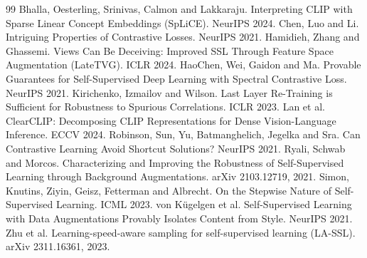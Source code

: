 \documentclass[11pt]{article}
\theoremstyle{definition}
\theoremstyle{remark}
\begin{document}
\begin{thebibliography}{99}\small
{} Bhalla, Oesterling, Srinivas, Calmon and Lakkaraju. Interpreting CLIP with Sparse Linear Concept
Embeddings (SpLiCE). NeurIPS 2024.
 Chen, Luo and Li. Intriguing Properties of Contrastive Losses. NeurIPS 2021.
 Hamidieh, Zhang and Ghassemi. Views Can Be Deceiving: Improved SSL Through Feature Space
Augmentation (LateTVG). ICLR 2024.
 HaoChen, Wei, Gaidon and Ma. Provable Guarantees for Self-Supervised Deep Learning with Spectral
Contrastive Loss. NeurIPS 2021.
 Kirichenko, Izmailov and Wilson. Last Layer Re-Training is Sufficient for Robustness to Spurious
Correlations. ICLR 2023.
 Lan et al. ClearCLIP: Decomposing CLIP Representations for Dense Vision-Language Inference. ECCV 2024.
 Robinson, Sun, Yu, Batmanghelich, Jegelka and Sra. Can Contrastive Learning Avoid Shortcut
Solutions? NeurIPS 2021.
 Ryali, Schwab and Morcos. Characterizing and Improving the Robustness of Self-Supervised Learning
through Background Augmentations. arXiv 2103.12719, 2021.
 Simon, Knutins, Ziyin, Geisz, Fetterman and Albrecht. On the Stepwise Nature of Self-Supervised
Learning. ICML 2023.
 von K\"ugelgen et al. Self-Supervised Learning with Data Augmentations Provably Isolates Content from
Style. NeurIPS 2021.
 Zhu et al. Learning-speed-aware sampling for self-supervised learning (LA-SSL). arXiv 2311.16361, 2023.
\end{thebibliography}
\end{document}
